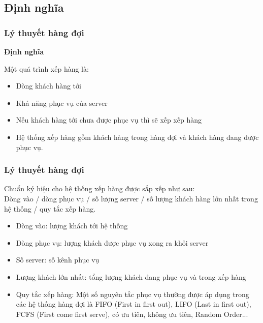 \documentclass[10pt]{beamer}
\begin{document}
\subsection{Định nghĩa}
\begin{frame}
\frametitle{Lý thuyết hàng đợi}
\begin{block}{\textbf{Định nghĩa}}
\par Một quá trình xếp hàng là:
\begin{itemize}
    \item Dòng khách hàng tới
    \item Khả năng phục vụ của server
    \item Nếu khách hàng tới chưa được phục vụ thì sẽ xếp xếp hàng
    \item Hệ thống xếp hàng gồm khách hàng trong hàng đợi và khách hàng đang được phục vụ.
\end{itemize}
\end{block}
\end{frame}
\begin{frame}
\frametitle{Lý thuyết hàng đợi}
\begin{block}
\par Chuẩn ký hiệu cho hệ thống xếp hàng được sắp xếp như sau:\\
Dòng vào / dòng phục vụ / số lượng server / số lượng khách hàng lớn nhất trong hệ thống / quy tắc xếp hàng.
\begin{itemize}
    \item Dòng vào: lượng khách tới hệ thống
    \item Dòng phục vụ: lượng khách được phục vụ xong ra khỏi server
    \item Số server: số kênh phục vụ
    \item  Lượng khách lớn nhất: tổng lượng khách đang phục vụ và trong xếp hàng
    \item Quy tắc xếp hàng: Một số nguyên tắc phục vụ thường được áp dụng trong các hệ thống hàng đợi là FIFO (First in first out), LIFO (Last in first out), FCFS (First come first serve), có ưu tiên, không ưu tiên, Random Order...
\end{itemize}
\end{block}
\end{frame}
\end{document}
